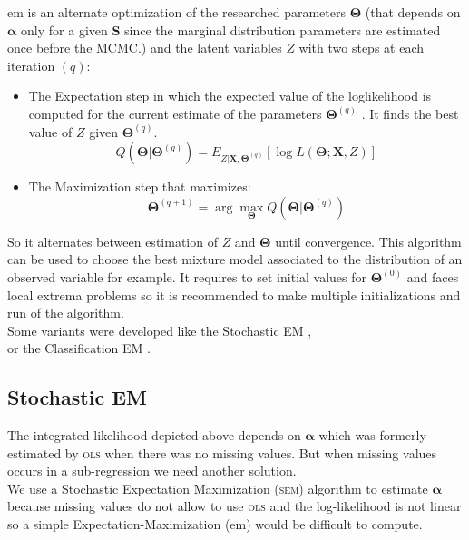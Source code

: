 \documentclass[12pt,a4paper]{report}
\begin{document}
{\sc em} is an alternate optimization of the researched parameters $\boldsymbol{\Theta}$ (that depends on $\boldsymbol{\alpha}$ only for a given $\boldsymbol{S}$ since the marginal distribution parameters are estimated once before the MCMC.) and the latent variables $Z$ with two steps at each iteration $(q)$:
\begin{itemize}
	\item The Expectation step in which the expected value of the loglikelihood is computed for the current estimate of the parameters $\boldsymbol{\Theta}^{(q)}$ . It finds the best value of $Z$ given $\boldsymbol{\Theta}^{(q)}$.
	\begin{equation}
		Q(\boldsymbol{\Theta}|\boldsymbol{\Theta}^{(q)})=E_{Z|\boldsymbol{X},\boldsymbol{\Theta}^{(q)}} [\log L(\boldsymbol{\Theta};\boldsymbol{X},Z)]  \nonumber 
	\end{equation}
	\item The Maximization step that maximizes:
	\begin{equation}
		\boldsymbol{\Theta}^{(q+1)}=\arg \max_{\boldsymbol{\Theta}} Q(\boldsymbol{\Theta}|\boldsymbol{\Theta}^{(q)})  \nonumber 
	\end{equation}
\end{itemize}
	So it alternates between estimation of $Z$ and $\boldsymbol{\Theta}$ until convergence. This algorithm can be used to choose the best mixture model associated to the distribution of an observed variable for example.		
	It requires to set initial values for $\boldsymbol{\Theta}^{(0)}$ and faces local extrema problems so it is recommended to make multiple initializations and run of the algorithm.\\
			
			Some variants were developed like the Stochastic EM \cite{diebolt1996stochastic},\\
			 \cite{celeux1986algorithme} or the Classification EM \cite{celeux1992classification}.
			
			
\subsection{Stochastic EM}
	The integrated likelihood depicted above depends on $\boldsymbol{\alpha}$ which was formerly estimated by \textsc{ols} when there was no missing values. But when missing values occurs in a sub-regression we need another solution.\\
	
	We use a  Stochastic Expectation Maximization (\textsc{sem}) algorithm \cite{celeux1986algorithme} to estimate $\boldsymbol{\alpha}$ because missing values do not allow to use \textsc{ols} and  the log-likelihood is not linear so a simple Expectation-Maximization ({\sc em}) would be difficult to compute.\\
	
\end{document}
